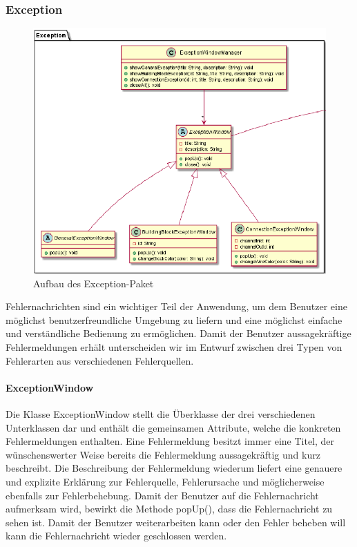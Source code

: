 \documentclass[parskip=full]{scrartcl}
\begin{document}
\newpage

\subsubsection{Exception}

\begin{figure}[htbp]
	\begin{center}
		\includegraphics[width = 14cm]{Grafiken/View/ExceptionNamespace.png}
		\caption{Aufbau des Exception-Paket}
		\label{Entwurf_Grob}
	\end{center}
\end{figure}

Fehlernachrichten sind ein wichtiger Teil der Anwendung, um dem Benutzer eine möglichst benutzerfreundliche Umgebung zu liefern und eine möglichst einfache und verständliche Bedienung zu ermöglichen. Damit der Benutzer aussagekräftige Fehlermeldungen erhält unterscheiden wir im Entwurf zwischen drei Typen von Fehlerarten aus verschiedenen Fehlerquellen.

\paragraph{ExceptionWindow}

Die Klasse ExceptionWindow stellt die Überklasse der drei verschiedenen Unterklassen dar und enthält die gemeinsamen Attribute, welche die konkreten Fehlermeldungen enthalten. Eine Fehlermeldung besitzt immer eine Titel, der wünschenswerter Weise bereits die Fehlermeldung aussagekräftig und kurz beschreibt. Die Beschreibung der Fehlermeldung wiederum liefert eine genauere und explizite Erklärung zur Fehlerquelle, Fehlerursache und möglicherweise ebenfalls zur Fehlerbehebung.
Damit der Benutzer auf die Fehlernachricht aufmerksam wird, bewirkt die Methode popUp(), dass die Fehlernachricht zu sehen ist. Damit der Benutzer weiterarbeiten kann oder den Fehler beheben will kann die Fehlernachricht wieder geschlossen werden.
\end{document}
